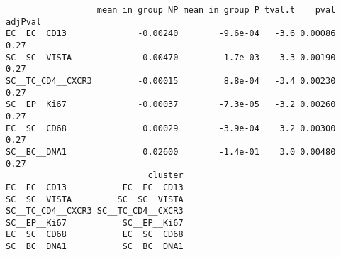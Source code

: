 \documentclass[
  letterpaper,
  DIV=11,
  numbers=noendperiod]{scrreprt}
\newenvironment{Shaded}{\begin{snugshade}}{\end{snugshade}}
\newcommand{\AttributeTok}[1]{\textcolor[rgb]{0.40,0.45,0.13}{#1}}
\newcommand{\CommentTok}[1]{\textcolor[rgb]{0.37,0.37,0.37}{#1}}
\newcommand{\DecValTok}[1]{\textcolor[rgb]{0.68,0.00,0.00}{#1}}
\newcommand{\FloatTok}[1]{\textcolor[rgb]{0.68,0.00,0.00}{#1}}
\newcommand{\FunctionTok}[1]{\textcolor[rgb]{0.28,0.35,0.67}{#1}}
\newcommand{\NormalTok}[1]{\textcolor[rgb]{0.00,0.23,0.31}{#1}}
\newcommand{\OtherTok}[1]{\textcolor[rgb]{0.00,0.23,0.31}{#1}}
\newcommand{\SpecialCharTok}[1]{\textcolor[rgb]{0.37,0.37,0.37}{#1}}
\newcommand{\StringTok}[1]{\textcolor[rgb]{0.13,0.47,0.30}{#1}}
\begin{document}
\begin{Shaded}
\end{Shaded}

\begin{verbatim}
                  mean in group NP mean in group P tval.t    pval adjPval
EC__EC__CD13              -0.00240        -9.6e-04   -3.6 0.00086    0.27
SC__SC__VISTA             -0.00470        -1.7e-03   -3.3 0.00190    0.27
SC__TC_CD4__CXCR3         -0.00015         8.8e-04   -3.4 0.00230    0.27
SC__EP__Ki67              -0.00037        -7.3e-05   -3.2 0.00260    0.27
EC__SC__CD68               0.00029        -3.9e-04    3.2 0.00300    0.27
SC__BC__DNA1               0.02600        -1.4e-01    3.0 0.00480    0.27
                            cluster
EC__EC__CD13           EC__EC__CD13
SC__SC__VISTA         SC__SC__VISTA
SC__TC_CD4__CXCR3 SC__TC_CD4__CXCR3
SC__EP__Ki67           SC__EP__Ki67
EC__SC__CD68           EC__SC__CD68
SC__BC__DNA1           SC__BC__DNA1
\end{verbatim}
\end{document}
